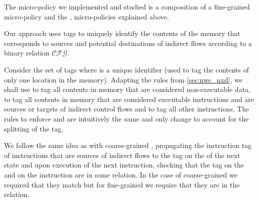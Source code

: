 The micro-policy we implemented and studied is a composition of a fine-grained
\CFI micro-policy and the \NWC, \NXD micro-policies explained above.

Our approach uses tags to uniquely identify the contents of the memory that 
corresponds to sources and potential destinations of indirect flows according to
a binary relation $\mathcal{CFG}$.

Consider the set of tags 
 where  is a unique identifier 
(\IE used to tag the contents of only one location in the memory). 
Adapting the rules from \ref{sec:nwc_nxd}, we shall use \DATAname to tag all 
contents in memory that are considered non-executable data, 
to tag all contents in memory that are considered executable instructions and 
are sources or targets of indirect control flows and \INSTR{$\bot$} to tag all
other instructions.
The rules to enforce \NWC and \NXD are intuitively the same and only
change to account for the splitting of the \INSTRname tag.

We follow the same idea as with coarse-grained \CFI, propagating the instruction
tag of instructions that are sources of indirect flows to the tag on the \pc of
the next state and upon execution of the next instruction, checking that the tag
on the \pc and on the instruction are in some relation. In the case of
coarse-grained \CFI we required that they match but for fine-grained \CFI we
require that they are in the \CFG relation.


